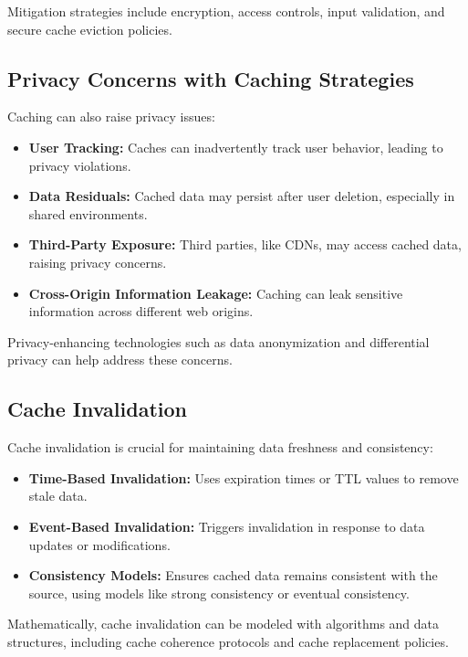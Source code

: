 \documentclass[12pt]{book} %
\begin{document}
Mitigation strategies include encryption, access controls, input validation, and secure cache eviction policies.

\subsection{Privacy Concerns with Caching Strategies}

Caching can also raise privacy issues:

\begin{itemize}
    \item \textbf{User Tracking:} Caches can inadvertently track user behavior, leading to privacy violations.
    \item \textbf{Data Residuals:} Cached data may persist after user deletion, especially in shared environments.
    \item \textbf{Third-Party Exposure:} Third parties, like CDNs, may access cached data, raising privacy concerns.
    \item \textbf{Cross-Origin Information Leakage:} Caching can leak sensitive information across different web origins.
\end{itemize}

Privacy-enhancing technologies such as data anonymization and differential privacy can help address these concerns.

\subsection{Cache Invalidation}

Cache invalidation is crucial for maintaining data freshness and consistency:

\begin{itemize}
    \item \textbf{Time-Based Invalidation:} Uses expiration times or TTL values to remove stale data.
    \item \textbf{Event-Based Invalidation:} Triggers invalidation in response to data updates or modifications.
    \item \textbf{Consistency Models:} Ensures cached data remains consistent with the source, using models like strong consistency or eventual consistency.
\end{itemize}

Mathematically, cache invalidation can be modeled with algorithms and data structures, including cache coherence protocols and cache replacement policies.
\end{document}
